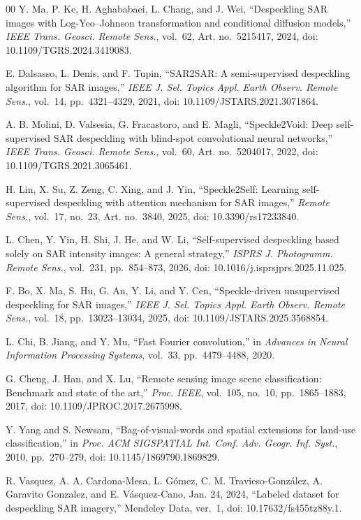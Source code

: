 \documentclass[journal]{IEEEtran}
\begin{document}
\begin{thebibliography}{00}
Y. Ma, P. Ke, H. Aghababaei, L. Chang, and J. Wei, ``Despeckling SAR images with Log-Yeo--Johnson transformation and conditional diffusion models,'' \emph{IEEE Trans. Geosci. Remote Sens.}, vol.~62, Art. no.~5215417, 2024, doi: 10.1109/TGRS.2024.3419083.

E. Dalsasso, L. Denis, and F. Tupin, ``SAR2SAR: A semi-supervised despeckling algorithm for SAR images,'' \emph{IEEE J. Sel. Topics Appl. Earth Observ. Remote Sens.}, vol.~14, pp.~4321--4329, 2021, doi: 10.1109/JSTARS.2021.3071864.

A. B. Molini, D. Valsesia, G. Fracastoro, and E. Magli, ``Speckle2Void: Deep self-supervised SAR despeckling with blind-spot convolutional neural networks,'' \emph{IEEE Trans. Geosci. Remote Sens.}, vol.~60, Art. no.~5204017, 2022, doi: 10.1109/TGRS.2021.3065461.

H. Lin, X. Su, Z. Zeng, C. Xing, and J. Yin, ``Speckle2Self: Learning self-supervised despeckling with attention mechanism for SAR images,'' \emph{Remote Sens.}, vol.~17, no.~23, Art. no.~3840, 2025, doi: 10.3390/rs17233840.

L. Chen, Y. Yin, H. Shi, J. He, and W. Li, ``Self-supervised despeckling based solely on SAR intensity images: A general strategy,'' \emph{ISPRS J. Photogramm. Remote Sens.}, vol.~231, pp.~854--873, 2026, doi: 10.1016/j.isprsjprs.2025.11.025.

F. Bo, X. Ma, S. Hu, G. An, Y. Li, and Y. Cen, ``Speckle-driven unsupervised despeckling for SAR images,'' \emph{IEEE J. Sel. Topics Appl. Earth Observ. Remote Sens.}, vol.~18, pp.~13023--13034, 2025, doi: 10.1109/JSTARS.2025.3568854.

L. Chi, B. Jiang, and Y. Mu, ``Fast Fourier convolution,'' in \emph{Advances in Neural Information Processing Systems}, vol.~33, pp.~4479--4488, 2020.

G. Cheng, J. Han, and X. Lu, ``Remote sensing image scene classification: Benchmark and state of the art,'' \emph{Proc. IEEE}, vol.~105, no.~10, pp.~1865--1883, 2017, doi: 10.1109/JPROC.2017.2675998.

Y. Yang and S. Newsam, ``Bag-of-visual-words and spatial extensions for land-use classification,'' in \emph{Proc. ACM SIGSPATIAL Int. Conf. Adv. Geogr. Inf. Syst.}, 2010, pp.~270--279, doi: 10.1145/1869790.1869829.

R. Vasquez, A. A. Cardona-Mesa, L. G\'omez, C. M. Travieso-Gonz\'alez, A. Garavito Gonzalez, and E. V\'asquez-Cano, Jan. 24, 2024, ``Labeled dataset for despeckling SAR imagery,'' Mendeley Data, ver.~1, doi: 10.17632/fs455tz88y.1.


\end{thebibliography}
\end{document}
